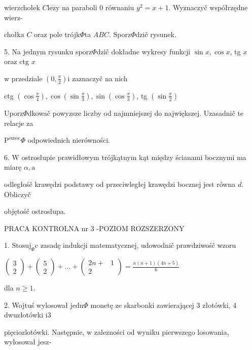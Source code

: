 \documentclass[a4paper,12pt]{article}
\begin{document}
wierzchołek $C\mathrm{l}\mathrm{e}\dot{\mathrm{z}}\mathrm{y}$ na paraboli $0$ równaniu $y^{2}=x+1$. Wyznaczyč współrzędne wierz-

chołka $C$ oraz pole trójk$\Phi$ta $ABC$. Sporz$\Phi$dzič rysunek.

5. Na jednym rysunku sporz$\Phi$dzič dokładne wykresy funkcji $\sin x, \cos x$, tg $x$ oraz ctg $x$

$\mathrm{w}$ przedziale $(0,\displaystyle \frac{\pi}{2}) \mathrm{i}$ zaznaczyč na nich

ctg $(\displaystyle \cos\frac{\pi}{4}), \displaystyle \cos(\sin\frac{\pi}{3}), \displaystyle \sin(\cos\frac{\pi}{3})$, tg $(\displaystyle \sin\frac{\pi}{2})$

Uporz$\Phi$dkowač powyzsze liczby od najmniejszej do największej. Uzasadnič te relacje za

$\mathrm{P}^{\mathrm{o}\mathrm{m}\mathrm{o}\mathrm{c}}\Phi$ odpowiednich nierówności.

6. $\mathrm{W}$ ostrosłupie prawidłowym trójkątnym kąt między ścianami bocznymi ma miarę $\alpha, \mathrm{a}$

odległośč krawędzi podstawy od przeciwległej krawędzi bocznej jest równa $d$. Obliczyč

objętośč ostrosłupa.





PRACA KONTROLNA nr 3 -POZIOM ROZSZERZONY

1. $\mathrm{S}\mathrm{t}\mathrm{o}\mathrm{s}\mathrm{u}\mathrm{j}_{\Phi}\mathrm{c}$ zasadę indukcji matematycznej, udowodnič prawdziwośč wzoru

$\left(\begin{array}{l}
3\\
2
\end{array}\right) + \left(\begin{array}{l}
5\\
2
\end{array}\right) +\ldots+\left(\begin{array}{ll}
2n+ & 1\\
2 & 
\end{array}\right) =\displaystyle \frac{n(n+1)(4n+5)}{6}$

dla $n\geq 1.$

2. Wojtuś wylosował $\mathrm{j}\mathrm{e}\mathrm{d}\mathrm{n}\Phi$ monetę ze skarbonki zawierającej 3 złotówki, 4 dwuzłotówki $\mathrm{i}3$

pięciozlotówki. Następnie, $\mathrm{w}$ zalezności od wyniku pierwszego losowania, wylosował jesz-
\end{document}
